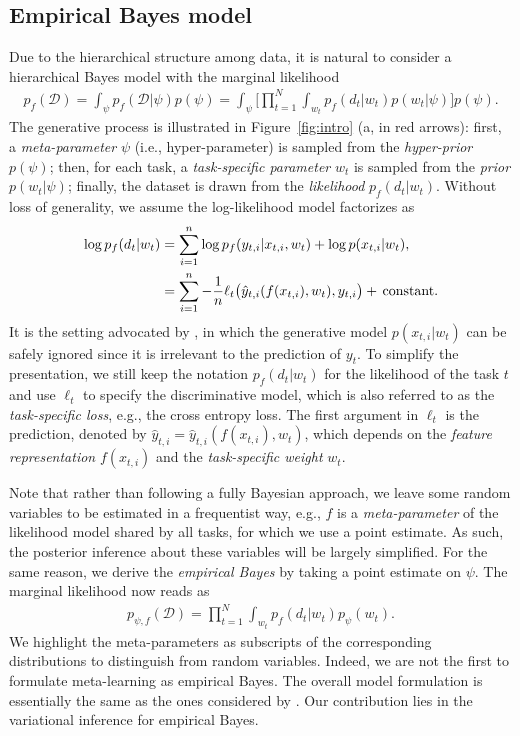 \documentclass{article} \usepackage{iclr2020_conference,times}
\def\gD{{\mathcal{D}}}
\newcommand{\nt}{n}
\begin{document}
\subsection{Empirical Bayes model}

Due to the hierarchical structure among data, it is natural to 
consider a hierarchical Bayes model with the marginal likelihood
\begin{align}
    p_f(\gD) = \int_\psi p_f(\gD | \psi) p(\psi)
    = \int_\psi \Big[ \prod_{t=1}^N \int_{w_t} p_f(d_t| w_t) p(w_t | \psi) \Big] p(\psi).
\end{align}
The generative process is illustrated in Figure~\ref{fig:intro} (a, in red arrows):
first, a \emph{meta-parameter} $\psi$ (i.e., hyper-parameter) is sampled from the \emph{hyper-prior} $p(\psi)$;
then, for each task, a \emph{task-specific parameter} $w_t$ is sampled from the \emph{prior} $p(w_t | \psi)$;
finally, the dataset is drawn from the \emph{likelihood} $p_f(d_t | w_t)$. Without loss of generality, we assume the log-likelihood model factorizes as 
\begin{align}
    \label{eq:lik}
    \log p_f(d_t | w_t) &= \sum_{i=1}^{\nt} \log p_f(y_{t,i} | x_{t,i}, w_t) + \log p(x_{t,i} | w_t), \notag \\
    &= \sum_{i=1}^{\nt} -\frac{1}{n} \ell_t\big( \hat{y}_{t,i}(f(x_{t,i}), w_t), y_{t,i} \big) + \,\text{constant}.
\end{align}
It is the setting advocated by \citet{minka2005discriminative}, 
in which the generative model $p(x_{t,i} | w_t)$ can be safely ignored since 
it is irrelevant to the prediction of $y_t$.
To simplify the presentation, 
we still keep the notation $p_f(d_t | w_t)$ for the likelihood of the task $t$ and 
use $\ell_t$ to specify the discriminative model, which is also referred to as
the \emph{task-specific loss}, e.g., the cross entropy loss. The first argument in $\ell_t$ is the prediction, denoted by $\hat{y}_{t,i} = \hat{y}_{t,i}(f(x_{t,i}), w_t)$, 
which depends on the \emph{feature representation} $f(x_{t,i})$ and the \emph{task-specific weight} $w_t$. 

Note that rather than following a fully Bayesian approach, 
we leave some random variables to be estimated in a frequentist way, 
e.g., $f$ is a \emph{meta-parameter} of the likelihood model shared by all tasks, 
for which we use a point estimate.
As such, the posterior inference about these variables will be largely simplified.
For the same reason, we derive the \emph{empirical Bayes} \mbox{\citep{robbins1985empirical,kucukelbir2014population}}
by taking a point estimate on $\psi$. The marginal likelihood now reads as
\begin{align}
    \label{eq:eb}
    p_{\psi, f}(\gD) = \prod_{t=1}^N \int_{w_t} p_f(d_t| w_t) p_\psi(w_t).
\end{align}
We highlight the meta-parameters as subscripts of the corresponding distributions to distinguish from random variables.
Indeed, we are not the first to formulate meta-learning as empirical Bayes.
The overall model formulation is essentially the same as the ones considered by 
\citet{amit2018meta,grant2018recasting,ravi2018amortized}. 
Our contribution lies in the variational inference for empirical Bayes.
\end{document}
